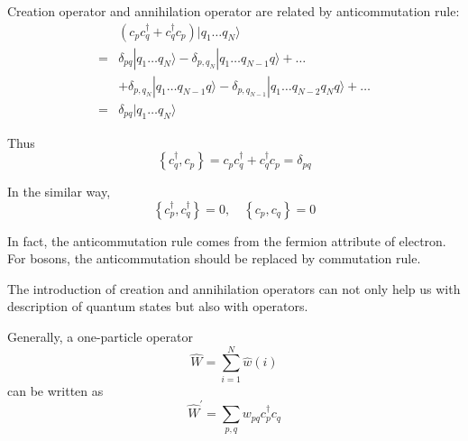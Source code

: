 Creation operator and annihilation operator are related by anticommutation rule:
\begin{equation}
\begin{aligned}
	&\left(c_{p} c_{q}^{\dagger}+c_{q}^{\dagger} c_{p}\right) | q_{1} \ldots q_{N} \rangle
	\\
	=&\delta_{p q} | q_{1} \ldots q_{N} \rangle-\delta_{p, q_{N}} | q_{1} \ldots q_{N-1} q \rangle+\ldots
	\\
	&+ \delta_{p, q_{N}} | q_{1} \ldots q_{N-1} q \rangle-\delta_{p, q_{N-1}} | q_{1} \ldots q_{N-2} q_{N} q \rangle+\ldots
	\\
	=&\delta_{p q} | q_{1} \ldots q_{N} \rangle
\end{aligned}
\end{equation}

Thus 
\begin{equation}
\left\{c_{q}^{\dagger}, c_{p}\right\}=c_{p} c_{q}^{\dagger}+c_{q}^{\dagger} c_{p}=\delta_{p q}
\end{equation}

In the similar way,
\begin{equation}
\left\{c_{p}^{\dagger}, c_{q}^{\dagger}\right\}=0, \quad\left\{c_{p}, c_{q}\right\}=0
\end{equation}

In fact, the anticommutation rule comes from the fermion attribute of electron.
For bosons, the anticommutation should be replaced by commutation rule.


The introduction of creation and annihilation operators can not only help us with description of quantum states but also with operators.

Generally, a one-particle operator
\begin{equation}
	\hat{W}=\sum_{i=1}^{N} \hat{w}(i)
\end{equation}
can be written as
\begin{equation}
\hat{W}^{\prime}=\sum_{p, q} w_{p q} c_{p}^{\dagger} c_{q}
\end{equation}

